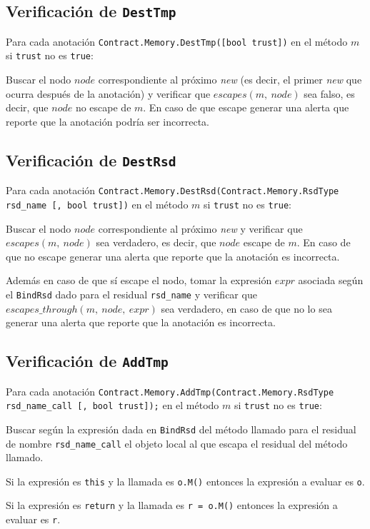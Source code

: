 \documentclass[12pt,a4paper]{article}
\newcommand\mono[1]{\texttt{#1}}
\begin{document}
		\subsection{Verificación de \mono{DestTmp}}
			Para cada anotación \mono{Contract.Memory.DestTmp([bool trust])} en el método $m$ si \mono{trust} no es \mono{true}:

			Buscar el nodo $node$ correspondiente al próximo \textit{new} (es decir, el primer \textit{new} que ocurra después de la anotación) y verificar que $escapes(m,\ node)$ sea falso, es decir, que $node$ no escape de $m$. En caso de que escape generar una alerta que reporte que la anotación podría ser incorrecta.
		\subsection{Verificación de \mono{DestRsd}}
			Para cada anotación \mono{Contract.Memory.DestRsd(Contract.Memory.RsdType \\ rsd\_name [, bool trust])} en el método $m$ si \mono{trust} no es \mono{true}:

			Buscar el nodo $node$ correspondiente al próximo \textit{new} y verificar que $escapes(m,\ node)$ sea verdadero, es decir, que $node$ escape de $m$. En caso de que no escape generar una alerta que reporte que la anotación es incorrecta.

			Además en caso de que sí escape el nodo, tomar la expresión $expr$ asociada según el \mono{BindRsd} dado para el residual \mono{rsd\_name} y verificar que $escapes\_through(m,\ node,\ expr)$ sea verdadero, en caso de que no lo sea generar una alerta que reporte que la anotación es incorrecta.
		\subsection{Verificación de \mono{AddTmp}}
			Para cada anotación \mono{Contract.Memory.AddTmp(Contract.Memory.RsdType \\ rsd\_name\_call [, bool trust]);} en el método $m$ si \mono{trust} no es \mono{true}:

			Buscar según la expresión dada en \mono{BindRsd} del método llamado para el residual de nombre \mono{rsd\_name\_call} el objeto local al que escapa el residual del método llamado.

			Si la expresión es \mono{this} y la llamada es \mono{o.M()} entonces la expresión a evaluar es \mono{o}.

			Si la expresión es \mono{return} y la llamada es \mono{r = o.M()} entonces la expresión a evaluar es \mono{r}.
\end{document}
